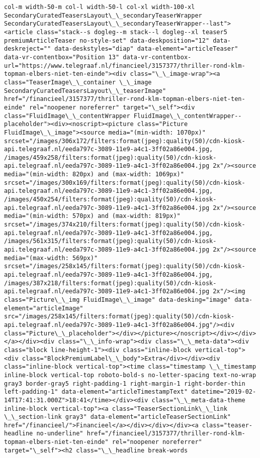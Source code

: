 \documentclass[11pt]{article}
\begin{document}
\begin{Verbatim}[commandchars=\\\{\}]
col-m width-50-m col-l width-50-l col-xl width-100-xl SecondaryCuratedTeasersLayout\_\_secondaryTeaserWrapper SecondaryCuratedTeasersLayout\_\_secondaryTeaserWrapper--last"><article class="stack--s dogleg--m stack--l dogleg--xl teaser5 premiumArticleTeaser no-style-set" data-deskposition="12" data-deskreject="" data-deskstyles="diap" data-element="articleTeaser" data-vr-contentbox="Position 13" data-vr-contentbox-url="https://www.telegraaf.nl/financieel/3157377/thriller-rond-klm-topman-elbers-niet-ten-einde"><div class="\_\_image-wrap"><a class="TeaserImage\_\_container \_\_image SecondaryCuratedTeasersLayout\_\_teaserImage" href="/financieel/3157377/thriller-rond-klm-topman-elbers-niet-ten-einde" rel="noopener noreferrer" target="\_self"><div class="FluidImage\_\_contentWrapper FluidImage\_\_contentWrapper--placeholder"><div><noscript><picture class="Picture FluidImage\_\_image"><source media="(min-width: 1070px)" srcset="/images/306x172/filters:format(jpeg):quality(50)/cdn-kiosk-api.telegraaf.nl/eeda797c-3089-11e9-a4c1-3ff02a86e004.jpg, /images/459x258/filters:format(jpeg):quality(50)/cdn-kiosk-api.telegraaf.nl/eeda797c-3089-11e9-a4c1-3ff02a86e004.jpg 2x"/><source media="(min-width: 820px) and (max-width: 1069px)" srcset="/images/300x169/filters:format(jpeg):quality(50)/cdn-kiosk-api.telegraaf.nl/eeda797c-3089-11e9-a4c1-3ff02a86e004.jpg, /images/450x254/filters:format(jpeg):quality(50)/cdn-kiosk-api.telegraaf.nl/eeda797c-3089-11e9-a4c1-3ff02a86e004.jpg 2x"/><source media="(min-width: 570px) and (max-width: 819px)" srcset="/images/374x210/filters:format(jpeg):quality(50)/cdn-kiosk-api.telegraaf.nl/eeda797c-3089-11e9-a4c1-3ff02a86e004.jpg, /images/561x315/filters:format(jpeg):quality(50)/cdn-kiosk-api.telegraaf.nl/eeda797c-3089-11e9-a4c1-3ff02a86e004.jpg 2x"/><source media="(max-width: 569px)" srcset="/images/258x145/filters:format(jpeg):quality(50)/cdn-kiosk-api.telegraaf.nl/eeda797c-3089-11e9-a4c1-3ff02a86e004.jpg, /images/387x218/filters:format(jpeg):quality(50)/cdn-kiosk-api.telegraaf.nl/eeda797c-3089-11e9-a4c1-3ff02a86e004.jpg 2x"/><img class="Picture\_\_img FluidImage\_\_image" data-desking="image" data-element="articleImage" src="/images/258x145/filters:format(jpeg):quality(50)/cdn-kiosk-api.telegraaf.nl/eeda797c-3089-11e9-a4c1-3ff02a86e004.jpg"/><div class="Picture\_\_placeholder"></div></picture></noscript></div></div></a></div><div class="\_\_info-wrap"><div class="\_\_meta-data"><div class="block line-height-1"><div class="inline-block vertical-top"><div class="BlockPremiumLabel\_\_body">Extra</div></div><div class="inline-block vertical-top"><time class="timestamp \_\_timestamp inline-block vertical-top roboto-bold-s no-letter-spacing text-no-wrap gray3 border-gray5 right-padding-1 right-margin-1 right-border-thin left-padding-1" data-element="articleTimestampText" datetime="2019-02-14T17:41:31.000Z">18:41</time></div><div class="\_\_meta-data-theme inline-block vertical-top"><a class="TeaserSectionLink\_\_link \_\_section-link gray3" data-element="articleTeaserSectionLink" href="/financieel/">Financieel</a></div></div></div><a class="teaser-headline no-underline" href="/financieel/3157377/thriller-rond-klm-topman-elbers-niet-ten-einde" rel="noopener noreferrer" target="\_self"><h2 class="\_\_headline break-words 
\end{Verbatim}
\end{document}
